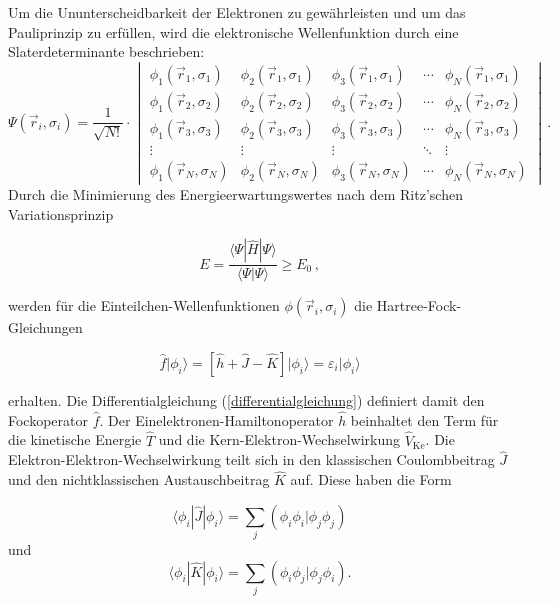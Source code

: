 Um die Ununterscheidbarkeit der Elektronen zu gewährleisten und um das Pau\-li\-prin\-zip\supercite{pauli1925zusammenhang} zu erfüllen, wird die elektronische Wellenfunktion durch eine Sla\-ter\-de\-ter\-mi\-nan\-te\supercite{slater1974self} beschrieben:
\begin{equation}
\Psi(\vec{r}_i,\sigma_i)=\frac{1}{\sqrt{N!}}\cdot\begin{vmatrix}
\phi_1(\vec{r}_1,\sigma_1) & \phi_2(\vec{r}_1,\sigma_1) & \phi_3(\vec{r}_1,\sigma_1) &\cdots & \phi_N(\vec{r}_1,\sigma_1) \\
\phi_1(\vec{r}_2,\sigma_2) & \phi_2(\vec{r}_2,\sigma_2) & \phi_3(\vec{r}_2,\sigma_2) &\cdots & \phi_N(\vec{r}_2,\sigma_2) \\
\phi_1(\vec{r}_3,\sigma_3) & \phi_2(\vec{r}_3,\sigma_3) & \phi_3(\vec{r}_3,\sigma_3) &\cdots & \phi_N(\vec{r}_3,\sigma_3) \\
\vdots & \vdots & \vdots & \ddots & \vdots\\
\phi_1(\vec{r}_N,\sigma_N) & \phi_2(\vec{r}_N,\sigma_N) & \phi_3(\vec{r}_N,\sigma_N) &\cdots & \phi_N(\vec{r}_N,\sigma_N)
\end{vmatrix}\, .
\end{equation}
\vfill
\newpage
Durch die Minimierung des Energieerwartungswertes nach dem Ritz'schen Va\-ria\-ti\-ons\-prin\-zip\supercite{macdonald1933successive}

\begin{equation}
E=\frac{\langle\Psi|\hat{H}|\Psi\rangle}{\langle\Psi|\Psi\rangle}\geq E_0\, ,
\end{equation}

werden für die Einteilchen-Wellenfunktionen $\phi(\vec{r}_i,\sigma_i)$ die Hartree-Fock-Gleichungen

\begin{equation}
\hat{f}\vert\phi_i\rangle=\left[\hat{h}+\hat{J}-\hat{K}\right]\vert\phi_i\rangle=\varepsilon_i\vert\phi_i\rangle
\label{differentialgleichung}
\end{equation}

erhalten. Die Differentialgleichung (\ref{differentialgleichung}) definiert damit den Fockoperator $\hat{f}$. Der Einelektronen-Hamiltonoperator $\hat{h}$ beinhaltet den Term für die kinetische Energie $\hat{T}$ und die Kern-Elektron-Wechselwirkung $\hat{V}_{\text{Ke}}$. Die Elektron-Elektron-Wechselwirkung teilt sich in den klassischen Coulombbeitrag $\hat{J}$ und den nichtklassischen Austauschbeitrag $\hat{K}$ auf. Diese haben die Form

\begin{equation}
\langle\phi_i|\hat{J}|\phi_i\rangle=\sum_j\left(\phi_i\phi_i|\phi_j\phi_j\right)
\end{equation}
und 
\begin{equation}
\langle\phi_i|\hat{K}|\phi_i\rangle=\sum_j\left(\phi_i\phi_j|\phi_j\phi_i\right).
\end{equation}


